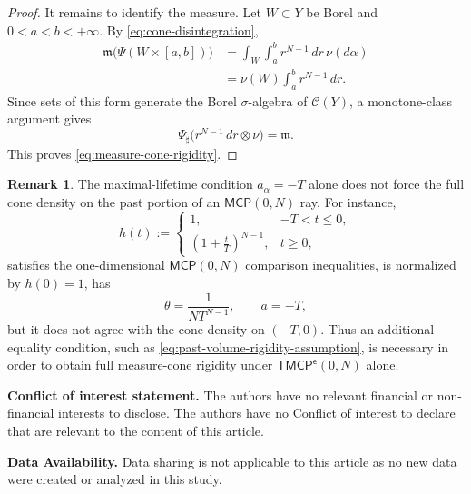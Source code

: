 \documentclass[a4paper,10pt]{article}
\newcommand{\mm}{\mathfrak m}
\theoremstyle{plain}
\theoremstyle{definition}
\newtheorem{remark}[lemma]{Remark}
\numberwithin{equation}{section}
\begin{document}
\begin{proof}
It remains to identify the measure. Let $W\subset Y$ be Borel and
$0<a<b<+\infty$. By \eqref{eq:cone-disintegration},
\begin{align*}
    \mm\bigl(\Psi(W\times[a,b])\bigr)
    &=
    \int_W\int_a^b r^{N-1}\,dr\,\nu(d\alpha)\\
    &=
    \nu(W)\int_a^b r^{N-1}\,dr.
\end{align*}
Since sets of this form generate the Borel $\sigma$-algebra of
$\mathcal C(Y)$, a monotone-class argument gives
\[
    \Psi_\sharp
    \bigl(r^{N-1}\,dr\otimes\nu\bigr)
    =
    \mm.
\]
This proves \eqref{eq:measure-cone-rigidity}.
\end{proof}


\begin{remark}\label{rem:MCP-maximal-ray-not-full-rigidity}
The maximal-lifetime condition $a_\alpha=-T$ alone does not force the
full cone density on the past portion of an $\mathsf{MCP}(0,N)$ ray.
For instance,
\[
    h(t):=
    \begin{cases}
        1, & -T<t\leq0,\\[0.2cm]
        \displaystyle
        \left(1+\frac{t}{T}\right)^{N-1},
        & t\geq0,
    \end{cases}
\]
satisfies the one-dimensional $\mathsf{MCP}(0,N)$ comparison
inequalities, is normalized by $h(0)=1$, has
\[
    \theta=\frac{1}{NT^{N-1}},
    \qquad
    a=-T,
\]
but it does not agree with the cone density on $(-T,0)$. Thus an
additional equality condition, such as
\eqref{eq:past-volume-rigidity-assumption}, is necessary in order to
obtain full measure-cone rigidity under $\mathsf{TMCP^e}(0,N)$ alone.
\end{remark}


\textbf{Conflict of interest statement.} The authors have no relevant financial or non-financial interests to disclose. The authors
have no Conflict of interest to declare that are relevant to the content of this article.
\smallskip


\textbf{Data Availability.} Data sharing is not applicable to this article as no new data were created or analyzed in this study.


\footnotesize{
%

}
\end{document}

